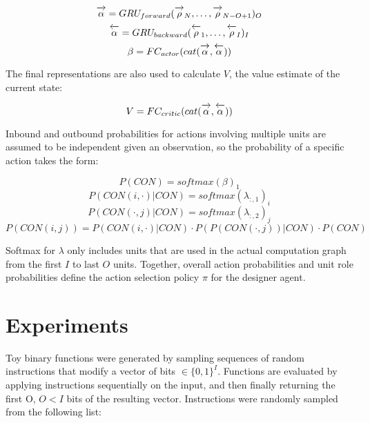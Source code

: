\documentclass{article}[12px]
\newcommand{\ora}[1]{\overrightarrow{#1\vphantom{j}}}
\newcommand{\ola}[1]{\overleftarrow{#1\vphantom{j}}}
\begin{document}
\begin{equation}
  \ora{\alpha} = GRU_{forward}(\ora{\rho}_{N}, \ldots, \ora{\rho}_{N-O+1})_O
\end{equation}
\begin{equation}
  \ola{\alpha} = GRU_{backward}(\ola{\rho}_1, \ldots, \ola{\rho}_I)_I
\end{equation}
\begin{equation}
  \beta = FC_{actor}(cat(\ora{\alpha}, \ola{\alpha}))
\end{equation}

The final representations are also used to calculate \(V\), the value estimate of the current state:

\begin{equation}
  V = FC_{critic}(cat(\ora{\alpha}, \ola{\alpha}))
\end{equation}

Inbound and outbound probabilities for actions involving multiple units are assumed to be independent given an observation, so the probability of a specific action takes the form:

\begin{equation}
  P(CON) = softmax(\beta)_1
\end{equation}
\begin{equation}
  P(CON(i, \cdot) | CON) = softmax(\lambda_{:, 1})_i
\end{equation}
\begin{equation}
  P(CON(\cdot, j) | CON) = softmax(\lambda_{:, 2})_j
\end{equation}
\begin{equation}
  P(CON(i, j)) = P(CON(i, \cdot) | CON) \cdot P(P(CON(\cdot, j)) | CON) \cdot P(CON)
\end{equation}

Softmax for \(\lambda\) only includes units that are used in the actual computation graph from the first \(I\) to last \(O\) units. Together, overall action probabilities and unit role probabilities define the action selection policy \(\pi\) for the designer agent.

\section{Experiments} \label{experiments}

Toy binary functions were generated by sampling sequences of random instructions that modify a vector of bits \(\in\{0, 1\}^I\). Functions are evaluated by applying instructions sequentially on the input, and then finally returning the first O, \(O < I\) bits of the resulting vector. Instructions were randomly sampled from the following list:
\end{document}
